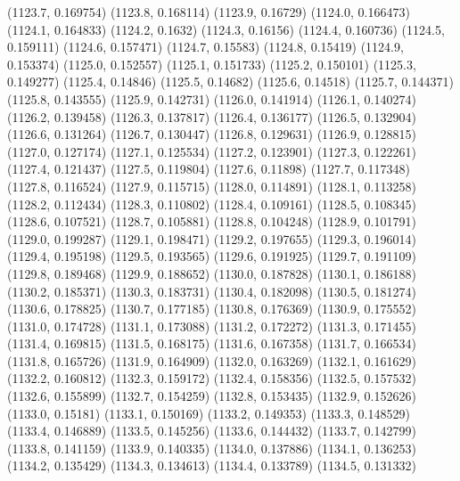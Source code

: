 {					(1123.7, 0.169754)
					(1123.8, 0.168114)
					(1123.9, 0.16729)
					(1124.0, 0.166473)
					(1124.1, 0.164833)
					(1124.2, 0.1632)
					(1124.3, 0.16156)
					(1124.4, 0.160736)
					(1124.5, 0.159111)
					(1124.6, 0.157471)
					(1124.7, 0.15583)
					(1124.8, 0.15419)
					(1124.9, 0.153374)
					(1125.0, 0.152557)
					(1125.1, 0.151733)
					(1125.2, 0.150101)
					(1125.3, 0.149277)
					(1125.4, 0.14846)
					(1125.5, 0.14682)
					(1125.6, 0.14518)
					(1125.7, 0.144371)
					(1125.8, 0.143555)
					(1125.9, 0.142731)
					(1126.0, 0.141914)
					(1126.1, 0.140274)
					(1126.2, 0.139458)
					(1126.3, 0.137817)
					(1126.4, 0.136177)
					(1126.5, 0.132904)
					(1126.6, 0.131264)
					(1126.7, 0.130447)
					(1126.8, 0.129631)
					(1126.9, 0.128815)
					(1127.0, 0.127174)
					(1127.1, 0.125534)
					(1127.2, 0.123901)
					(1127.3, 0.122261)
					(1127.4, 0.121437)
					(1127.5, 0.119804)
					(1127.6, 0.11898)
					(1127.7, 0.117348)
					(1127.8, 0.116524)
					(1127.9, 0.115715)
					(1128.0, 0.114891)
					(1128.1, 0.113258)
					(1128.2, 0.112434)
					(1128.3, 0.110802)
					(1128.4, 0.109161)
					(1128.5, 0.108345)
					(1128.6, 0.107521)
					(1128.7, 0.105881)
					(1128.8, 0.104248)
					(1128.9, 0.101791)
					(1129.0, 0.199287)
					(1129.1, 0.198471)
					(1129.2, 0.197655)
					(1129.3, 0.196014)
					(1129.4, 0.195198)
					(1129.5, 0.193565)
					(1129.6, 0.191925)
					(1129.7, 0.191109)
					(1129.8, 0.189468)
					(1129.9, 0.188652)
					(1130.0, 0.187828)
					(1130.1, 0.186188)
					(1130.2, 0.185371)
					(1130.3, 0.183731)
					(1130.4, 0.182098)
					(1130.5, 0.181274)
					(1130.6, 0.178825)
					(1130.7, 0.177185)
					(1130.8, 0.176369)
					(1130.9, 0.175552)
					(1131.0, 0.174728)
					(1131.1, 0.173088)
					(1131.2, 0.172272)
					(1131.3, 0.171455)
					(1131.4, 0.169815)
					(1131.5, 0.168175)
					(1131.6, 0.167358)
					(1131.7, 0.166534)
					(1131.8, 0.165726)
					(1131.9, 0.164909)
					(1132.0, 0.163269)
					(1132.1, 0.161629)
					(1132.2, 0.160812)
					(1132.3, 0.159172)
					(1132.4, 0.158356)
					(1132.5, 0.157532)
					(1132.6, 0.155899)
					(1132.7, 0.154259)
					(1132.8, 0.153435)
					(1132.9, 0.152626)
					(1133.0, 0.15181)
					(1133.1, 0.150169)
					(1133.2, 0.149353)
					(1133.3, 0.148529)
					(1133.4, 0.146889)
					(1133.5, 0.145256)
					(1133.6, 0.144432)
					(1133.7, 0.142799)
					(1133.8, 0.141159)
					(1133.9, 0.140335)
					(1134.0, 0.137886)
					(1134.1, 0.136253)
					(1134.2, 0.135429)
					(1134.3, 0.134613)
					(1134.4, 0.133789)
					(1134.5, 0.131332)
}
